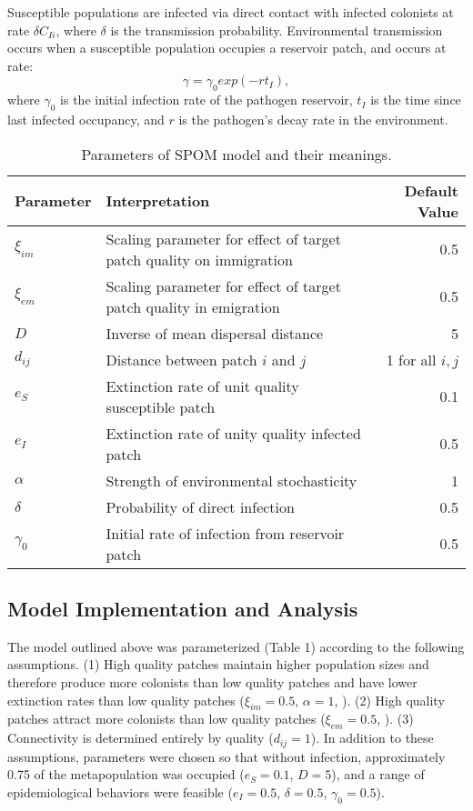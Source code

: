 \documentclass{svjour3}
\begin{document}
Susceptible populations are infected via direct contact with infected colonists at rate $\delta C_{Ii}$, where $\delta$ is the transmission probability.  Environmental transmission occurs when a susceptible population occupies a reservoir patch, and occurs at rate:
\begin{equation}
\gamma=\gamma_0exp(-rt_I),
\end{equation}
where $\gamma_0$ is the initial infection rate of the pathogen reservoir, $t_I$ is the time since last infected occupancy, and $r$ is the pathogen's decay rate in the environment.


\begin{table}[h!]
\label{parameters}      
\caption{Parameters of SPOM model and their meanings.}
\begin{tabular}{l p{8.5cm} r}
Parameter & Interpretation &  Default Value\\
\hline
$\xi_{im}$ & Scaling parameter for effect of target patch quality on immigration & 0.5\\
$\xi_{em}$ & Scaling parameter for effect of target patch quality in emigration & 0.5\\
$D$& Inverse of mean dispersal distance & 5\\
$d_{ij}$ & Distance between patch $i$ and $j$ & 1 for all $i,j$\\
\hline
$e_S$ & Extinction rate of unit quality susceptible patch & 0.1\\
$e_I$ & Extinction rate of unity quality infected patch & 0.5\\
$\alpha$ & Strength of environmental stochasticity & 1\\
\hline
$\delta$ & Probability of direct infection & 0.5\\
$\gamma_0$ & Initial rate of infection from reservoir patch & 0.5
\end{tabular}
\end{table}

\subsection{Model Implementation and Analysis}

The model outlined above was parameterized (Table 1) according to the following assumptions. (1) High quality patches maintain higher population sizes and therefore produce more colonists than low quality patches and have lower extinction rates than low quality patches ($\xi_{im}=0.5$, $\alpha=1$, \cite{Hanski2003}).  (2) High quality patches attract more colonists than low quality patches ($\xi_{em}=0.5$, \cite{Hanski2003}).  (3)  Connectivity is determined entirely by quality ($d_{ij}=1$).  In addition to these assumptions, parameters were chosen so that without infection, approximately 0.75 of the metapopulation was occupied ($e_S = 0.1$, $D=5$), and a range of epidemiological behaviors were feasible ($e_I = 0.5$, $\delta = 0.5$, $\gamma_0 = 0.5$). 
\end{document}

